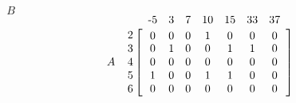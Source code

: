 \documentclass{article}
\newcommand{\indsize}{}
\newcommand{\colind}[2]{\displaystyle\smash{\mathop{#1}^{\raisebox{.5\normalbaselineskip}{\indsize #2}}}}
\newcommand{\rowind}[1]{\mbox{\indsize #1}}
\begin{document}
\begin{center}
    $\:\:\:B$
\end{center}
\[
    A \: \: \: \: \:
  \begin{array}{@{}c@{}}
    \rowind{2} \\ \rowind{3} \\ \rowind{4} \\ \rowind{5} \\ \rowind{6}
  \end{array}
  \mathop{\left[
  \begin{array}{ *{7}{c} }
     \colind{0}{-5}  &  \colind{0}{3}  &  \colind{0}{7}  & \colind{1}{10} & \colind{0}{15}  & \colind{0}{33} & \colind{0}{37}\\
     0 & 1 & 0 & 0 & 1 & 1 & 0 \\
     0 & 0 & 0 & 0 & 0 & 0 & 0 \\
     1 & 0 & 0 & 1 & 1 & 0 & 0 \\
     0 & 0 & 0 & 0 & 0 & 0 & 0
  \end{array}
  \right]}^{
  }
\]
\end{document}

